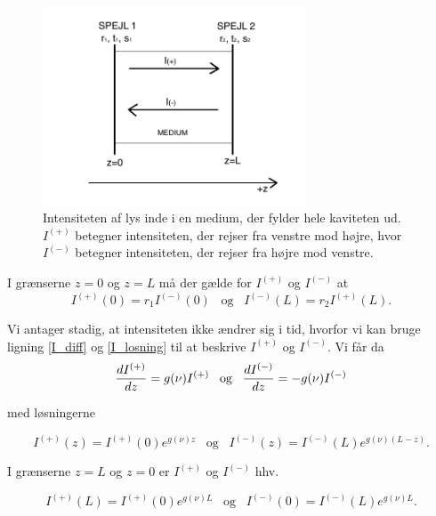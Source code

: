 \begin{figure}[h!]
  \centering
  \includegraphics[width=0.7\textwidth]{Laserfysik/kavitet.png}
  \caption{Intensiteten af lys inde i en medium, der fylder hele kaviteten ud. $I^{(+)}$ betegner intensiteten, der rejser fra venstre mod højre, hvor $I^{(-)}$ betegner intensiteten, der rejser fra højre mod venstre.}
  \label{fig:kavitet}
\end{figure}

I grænserne $z=0$ og $z=L$ må der gælde for $I^{(+)}$ og $I^{(-)}$ at 
\begin{equation}
I^{(+)}(0) = r_1I^{(-)}(0) \,\,\,\,\, \text{og} \,\,\,\,\, I^{(-)}(L) = r_2I^{(+)}(L). 
\label{eq:graense1}
\end{equation}

Vi antager stadig, at intensiteten ikke ændrer sig i tid, hvorfor vi kan bruge ligning \ref{I_diff} og \ref{I_losning} til at beskrive $I^{(+)}$ og $I^{(-)}$. Vi får da 
\begin{equation}
{d{I^{(+)}} \over d{z}} = g(\nu)I^{(+)} \,\,\,\,\, \text{og} \,\,\,\,\, {d{I^{(-)}} \over d{z}} = -g(\nu)I^{(-)}
\label{eq:inten}
\end{equation}

med løsningerne 

\begin{equation}
I^{(+)}(z) = I^{(+)}(0)e^{g(\nu)z} \,\,\,\,\, \text{og} \,\,\,\,\,  I^{(-)}(z) = I^{(-)}(L)e^{g(\nu)(L-z)}.
\label{eq:intenlosning}
\end{equation}

I grænserne $z=L$ og $z=0$ er $I^{(+)}$ og $I^{(-)}$ hhv. 

\begin{equation}
I^{(+)}(L) = I^{(+)}(0)e^{g(\nu)L} \,\,\,\,\, \text{og} \,\,\,\,\, I^{(-)}(0) = I^{(-)}(L)e^{g(\nu)L}. 
\label{graenselosning}
\end{equation}

